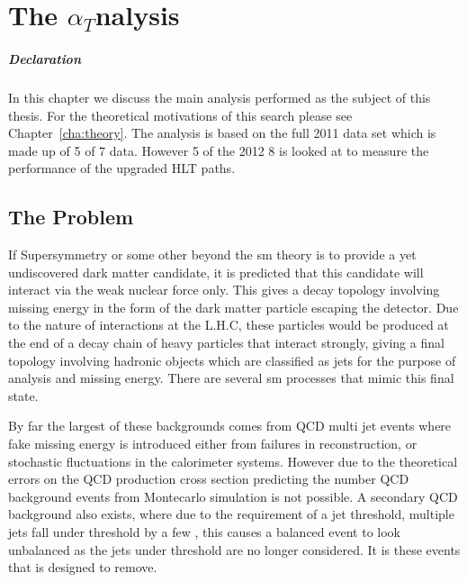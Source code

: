\chapter{The \texorpdfstring{$\alpha_{T}$} analysis} %
\label{cha:the_t_analysis}
\paragraph{Declaration} %
\label{par:declaration}


In this chapter we discuss the main analysis performed as the subject of this 
thesis. For the theoretical motivations of this search please see 
Chapter~\ref{cha:theory}. The analysis is based on the full 2011 data set which is made up of \unit{5}{\invfb} of \unit{7}{\TeV} data. However \unit{5}{\invfb} of the 2012 \unit{8}{\TeV} is looked at to measure the performance of the upgraded \alt HLT paths.
\section{The Problem} %
\label{sec:the_problem}
If Supersymmetry or some other beyond the \ac{sm} theory is to provide a 
yet undiscovered dark matter candidate, it is predicted that this candidate 
will interact via the weak nuclear force only. This gives a decay topology 
involving missing energy in the form of the dark matter particle escaping the 
detector. Due to the nature of interactions at the L.H.C, these particles would 
be produced at the end of a decay chain of heavy particles that interact 
strongly, giving a final topology involving hadronic objects which are 
classified as jets for the purpose of analysis and missing energy.
There are several \ac{sm} processes that mimic this final state.

By far the largest of these backgrounds comes from QCD multi jet events where 
fake missing energy is introduced either from failures in reconstruction, or 
stochastic fluctuations in the calorimeter systems.
However due to the theoretical errors on the QCD production cross section 
predicting the number QCD background events from Montecarlo simulation is not 
possible.
A secondary QCD background also exists, where due to the requirement of a jet 
\ET threshold, multiple jets fall under threshold by a few \GeV, this causes a 
balanced event to look unbalanced as the jets under threshold are no longer 
considered. It is these events that \alt is designed to remove.

